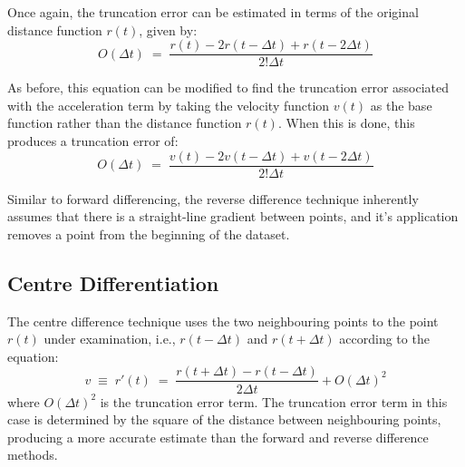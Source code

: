 \documentclass[namedreferences]{SolarPhysics}
\begin{document}
\begin{article}

Once again, the truncation error can be estimated in terms of the original distance function $r(t)$, given by:
\begin{equation}
O(\Delta t) \; = \; \frac{r(t) - 2r(t - \Delta t) + r(t - 2\Delta t)}{2!\Delta t}
\end{equation}

As before, this equation can be modified to find the truncation error associated with the acceleration term by taking the velocity function $v(t)$ as the base function rather than the distance function $r(t)$. When this is done, this produces a truncation error of:
\begin{equation}
O(\Delta t) \; = \; \frac{v(t) - 2v(t - \Delta t) + v(t - 2\Delta t)}{2!\Delta t}
\end{equation}

Similar to forward differencing, the reverse difference technique inherently assumes that there is a straight-line gradient between points, and it's application removes a point from the beginning of the dataset.



\subsection{Centre Differentiation}

The centre difference technique uses the two neighbouring points to the point $r(t)$ under examination, i.e., $r(t - \Delta t)$ and $r(t + \Delta t)$ according to the equation:
\begin{equation}
v \; \equiv \; r'(t) \; = \; \frac{r(t + \Delta t) - r(t - \Delta t)}{2 \Delta t} + O(\Delta t)^{2}
\end{equation}
where $O(\Delta t)^{2}$ is the truncation error term. The truncation error term in this case is determined by the square of the distance between neighbouring points, producing a more accurate estimate than the forward and reverse difference methods. 


\end{article}
\end{document}
